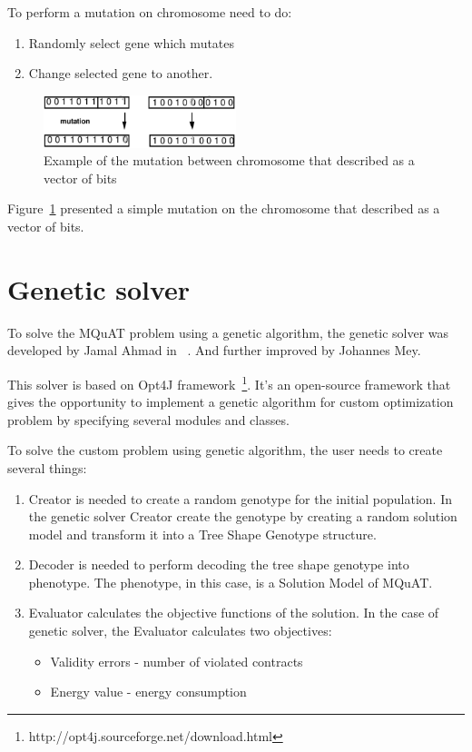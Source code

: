 To perform a mutation on chromosome need to do:
\begin{enumerate}
	\item Randomly select gene which mutates
	\item Change selected gene to another.
\end{enumerate}
\begin{figure}
	\centering
	\includegraphics[width=0.5\textwidth]{images/MutationVector.png}
	\caption[Example of the mutation]{Example of the mutation between chromosome that described as a vector of bits}
	\label{fig:MutationVector}
\end{figure}
Figure~\ref{fig:MutationVector} presented a simple mutation on the chromosome that described as a vector of bits.




\section{Genetic solver}
To solve the MQuAT problem using a genetic algorithm, the genetic solver was developed by Jamal Ahmad in ~\cite{ahmad18}. And further improved by Johannes Mey.

This solver is based on Opt4J framework~\footnote{http://opt4j.sourceforge.net/download.html}. It's an open-source framework that gives the opportunity to implement a genetic algorithm for custom optimization problem by specifying several modules and classes.

To solve the custom problem using genetic algorithm, the user needs to create several things:
\begin{enumerate}
	\item Creator is needed to create a random genotype for the initial population.
	In the genetic solver Creator create the genotype by creating a random solution model and transform it into a Tree Shape Genotype structure.
	\item Decoder is needed to perform decoding the tree shape genotype into phenotype. The phenotype, in this case, is a Solution Model of MQuAT.
	\item Evaluator calculates the objective functions of the solution. In the case of genetic solver, the Evaluator calculates two objectives: 
	\begin{itemize}
		\item Validity errors - number of violated contracts
		\item Energy value - energy consumption
	\end{itemize}
\end{enumerate}

